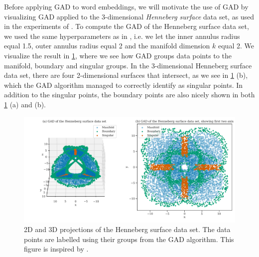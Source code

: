 Before applying GAD to word embeddings, we will motivate the use of GAD by visualizing GAD applied to the 3-dimensional \textit{Henneberg surface} data set, as used in the experiments of \cite{stolz2020geometric}. To compute the GAD of the Henneberg surface data set, we used the same hyperparameters as in \cite{stolz2020geometric}, i.e. we let the inner annulus radius equal 1.5, outer annulus radius equal 2 and the manifold dimension $k$ equal 2. We visualize the result in \cref{fig:gad-henneberg-3d}, where we see how GAD groups data points to the manifold, boundary and singular groups. In the 3-dimensional Henneberg surface data set, there are four 2-dimensional surfaces that intersect, as we see in \cref{fig:gad-henneberg-3d} (b), which the GAD algorithm managed to correctly identify as singular points. In addition to the singular points, the boundary points are also nicely shown in both \cref{fig:gad-henneberg-3d} (a) and (b).
\begin{figure}[H]
    \centering
    \includegraphics[width=\textwidth]{thesis/figures/gad-henneberg-3d.pdf}
    \caption{2D and 3D projections of the Henneberg surface data set. The data points are labelled using their groups from the GAD algorithm. This figure is inspired by \cite[Figure 3]{stolz2020geometric}.}
    \label{fig:gad-henneberg-3d}
\end{figure}


